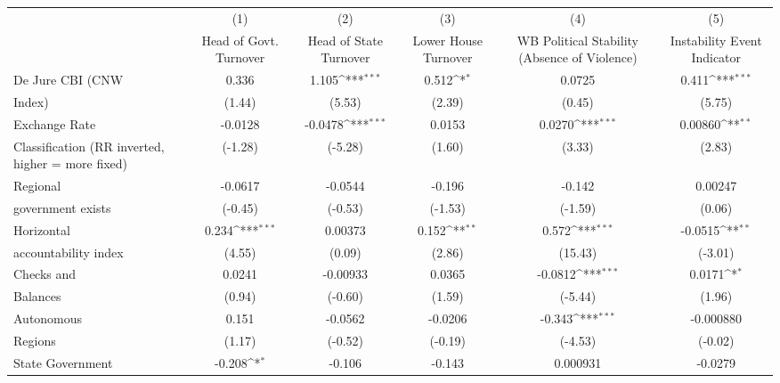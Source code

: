 {
\def\sym#1{\ifmmode^{#1}\else\(^{#1}\)\fi}
\begin{tabular}{l*{5}{c}}
\toprule
                &\multicolumn{1}{c}{(1)}&\multicolumn{1}{c}{(2)}&\multicolumn{1}{c}{(3)}&\multicolumn{1}{c}{(4)}&\multicolumn{1}{c}{(5)}\\
                &\multicolumn{1}{c}{Head of Govt. Turnover}&\multicolumn{1}{c}{Head of State Turnover}&\multicolumn{1}{c}{Lower House Turnover}&\multicolumn{1}{c}{WB Political Stability (Absence of Violence)}&\multicolumn{1}{c}{Instability Event Indicator}\\
\midrule
De Jure CBI (CNW&    0.336         &    1.105\sym{***}&    0.512\sym{*}  &   0.0725         &    0.411\sym{***}\\
Index)          &   (1.44)         &   (5.53)         &   (2.39)         &   (0.45)         &   (5.75)         \\
\addlinespace
Exchange Rate   &  -0.0128         &  -0.0478\sym{***}&   0.0153         &   0.0270\sym{***}&  0.00860\sym{**} \\
Classification (RR inverted, higher = more fixed)&  (-1.28)         &  (-5.28)         &   (1.60)         &   (3.33)         &   (2.83)         \\
\addlinespace
Regional        &  -0.0617         &  -0.0544         &   -0.196         &   -0.142         &  0.00247         \\
government exists   &  (-0.45)         &  (-0.53)         &  (-1.53)         &  (-1.59)         &   (0.06)         \\
\addlinespace
Horizontal      &    0.234\sym{***}&  0.00373         &    0.152\sym{**} &    0.572\sym{***}&  -0.0515\sym{**} \\
accountability index&   (4.55)         &   (0.09)         &   (2.86)         &  (15.43)         &  (-3.01)         \\
\addlinespace
Checks and      &   0.0241         & -0.00933         &   0.0365         &  -0.0812\sym{***}&   0.0171\sym{*}  \\
Balances        &   (0.94)         &  (-0.60)         &   (1.59)         &  (-5.44)         &   (1.96)         \\
\addlinespace
Autonomous      &    0.151         &  -0.0562         &  -0.0206         &   -0.343\sym{***}&-0.000880         \\
Regions         &   (1.17)         &  (-0.52)         &  (-0.19)         &  (-4.53)         &  (-0.02)         \\
\addlinespace
State Government&   -0.208\sym{*}  &   -0.106         &   -0.143         & 0.000931         &  -0.0279         \\

\end{tabular}}
